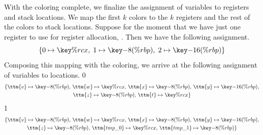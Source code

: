 \documentclass[7x10]{TimesAPriori_MIT}%
\def\racketEd{0}
\def\pythonEd{1}
\def\edition{1}
\newcommand{\pythonColor}[0]{}
\numberwithin{theorem}{chapter}
\numberwithin{definition}{chapter}
\numberwithin{equation}{chapter}
\begin{document}
With the coloring complete, we finalize the assignment of variables to
registers and stack locations. We map the first $k$ colors to the $k$
registers and the rest of the colors to stack locations.  Suppose for
the moment that we have just one register to use for register
allocation, . Then we have the following assignment.
\[
  \{ 0 \mapsto \key{\%rcx}, \; 1 \mapsto \key{-8(\%rbp)}, \; 2 \mapsto \key{-16(\%rbp)} \}
\]
Composing this mapping with the coloring, we arrive at the following
assignment of variables to locations.
{\if\edition\racketEd      
\begin{gather*}
  \{ \ttm{v} \mapsto \key{-8(\%rbp)}, \,
     \ttm{w} \mapsto \key{\%rcx},  \,
     \ttm{x} \mapsto \key{-8(\%rbp)}, \,
     \ttm{y} \mapsto \key{-16(\%rbp)}, \\
     \ttm{z} \mapsto \key{-8(\%rbp)}, \,
     \ttm{t} \mapsto \key{\%rcx} \}
\end{gather*}
\fi}
{\if\edition\pythonEd\pythonColor
\begin{gather*}
  \{ \ttm{v} \mapsto \key{-8(\%rbp)},  \,
     \ttm{w} \mapsto \key{\%rcx}, \,
     \ttm{x} \mapsto \key{-8(\%rbp)}, \,
     \ttm{y} \mapsto \key{-16(\%rbp)}, \\
     \ttm{z} \mapsto \key{-8(\%rbp)}, \,
     \ttm{tmp\_0} \mapsto \key{\%rcx}, \,
     \ttm{tmp\_1} \mapsto \key{-8(\%rbp)} \}
\end{gather*}
\fi}
\end{document}
